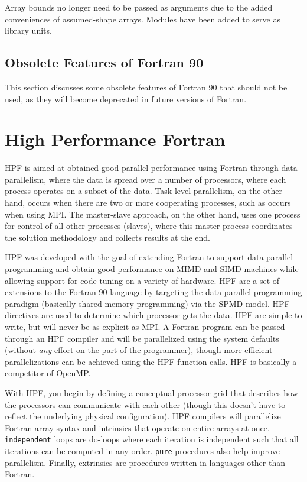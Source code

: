 \documentclass[10pt]{article}
\begin{document}
Array bounds no longer need to be passed as arguments due to the added conveniences of assumed-shape arrays. Modules have been added to serve as library units.

\subsection{Obsolete Features of Fortran 90}
This section discusses some obsolete features of Fortran 90 that should not be used, as they will become deprecated in future versions of Fortran.

\section{High Performance Fortran}
HPF is aimed at obtained good parallel performance using Fortran through data parallelism, where the data is spread over a number of processors, where each process operates on a subset of the data. Task-level parallelism, on the other hand, occurs when there are two or more cooperating processes, such as occurs when using MPI. The master-slave approach, on the other hand, uses one process for control of all other processes (slaves), where this master process coordinates the solution methodology and collects results at the end.

HPF was developed with the goal of extending Fortran to support data parallel programming and obtain good performance on MIMD and SIMD machines while allowing support for code tuning on a variety of hardware. HPF are a set of extensions to the Fortran 90 language by targeting the data parallel programming paradigm (basically shared memory programming) via the SPMD model. HPF directives are used to determine which processor gets the data. HPF are simple to write, but will never be as explicit as MPI. A Fortran program can be passed through an HPF compiler and will be parallelized using the system defaults (without {\it any} effort on the part of the programmer), though more efficient parallelizations can be achieved using the HPF function calls. HPF is basically a competitor of OpenMP.

With HPF, you begin by defining a conceptual processor grid that describes how the processors can communicate with each other (though this doesn't have to reflect the underlying physical configuration). HPF compilers will parallelize Fortran array syntax and intrinsics that operate on entire arrays at once. {\tt independent} loops are do-loops where each iteration is independent such that all iterations can be computed in any order. {\tt pure} procedures also help improve parallelism. Finally, extrinsics are procedures written in languages other than Fortran. 
\end{document}
